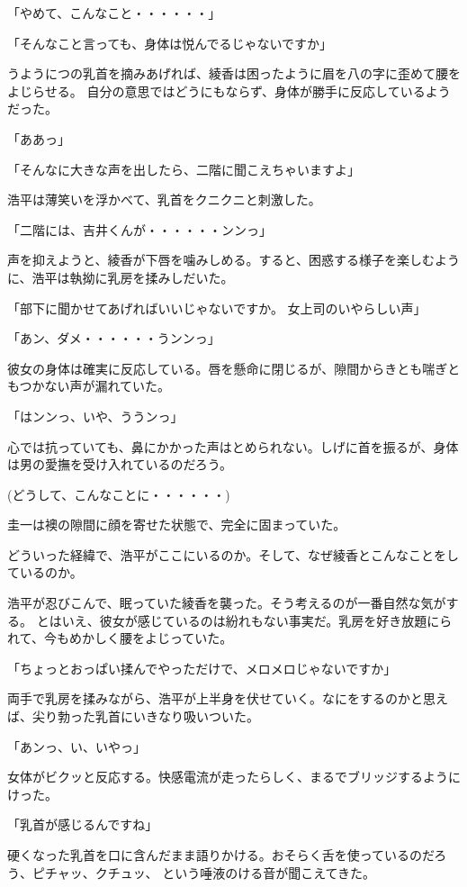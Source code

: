 ﻿\documentclass[book,tate]{jlreq}
\begin{document}
「やめて、こんなこと・・・・・・」

「そんなこと言っても、身体は悦んでるじゃないですか」

うようにつの乳首を摘みあげれば、綾香は困ったように眉を八の字に歪めて腰をよじらせる。
自分の意思ではどうにもならず、身体が勝手に反応しているようだった。

「ああっ」

「そんなに大きな声を出したら、二階に聞こえちゃいますよ」

浩平は薄笑いを浮かべて、乳首をクニクニと刺激した。

「二階には、吉井くんが・・・・・・ンンっ」

声を抑えようと、綾香が下唇を噛みしめる。すると、困惑する様子を楽しむように、浩平は執拗に乳房を揉みしだいた。

「部下に聞かせてあげればいいじゃないですか。 女上司のいやらしい声」

「あン、ダメ・・・・・・うンンっ」

彼女の身体は確実に反応している。唇を懸命に閉じるが、隙間からきとも喘ぎともつかない声が漏れていた。

「はンンっ、いや、ううンっ」

心では抗っていても、鼻にかかった声はとめられない。しげに首を振るが、身体は男の愛撫を受け入れているのだろう。

(どうして、こんなことに・・・・・・)

圭一は襖の隙間に顔を寄せた状態で、完全に固まっていた。

どういった経緯で、浩平がここにいるのか。そして、なぜ綾香とこんなことをしているのか。

浩平が忍びこんで、眠っていた綾香を襲った。そう考えるのが一番自然な気がする。
とはいえ、彼女が感じているのは紛れもない事実だ。乳房を好き放題にられて、今もめかしく腰をよじっていた。

「ちょっとおっぱい揉んでやっただけで、メロメロじゃないですか」

両手で乳房を揉みながら、浩平が上半身を伏せていく。なにをするのかと思えば、尖り勃った乳首にいきなり吸いついた。

「あンっ、い、いやっ」

女体がビクッと反応する。快感電流が走ったらしく、まるでブリッジするようにけった。

「乳首が感じるんですね」

硬くなった乳首を口に含んだまま語りかける。おそらく舌を使っているのだろう、ピチャッ、クチュッ、
という唾液のける音が聞こえてきた。
\end{document}
